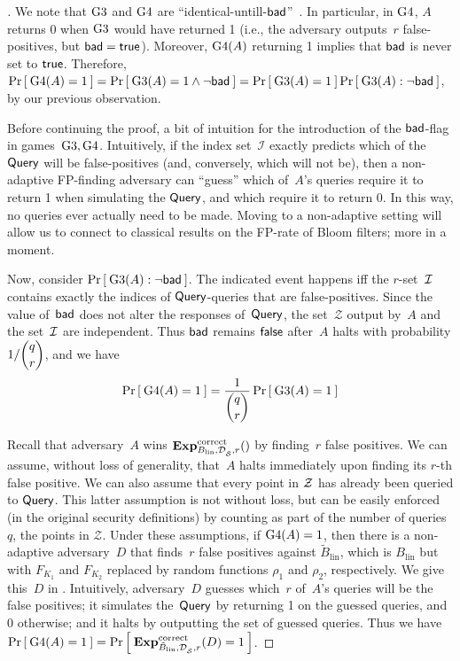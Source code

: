 \begin{proof}[]
We note that $\text{G3}$ and $\text{G4}$ are
``identical-untill-$\mathsf{bad}$''~\cite{BeRo-gameplaying}.  In particular,
in $\text{G4}$, $A$ returns 0 when $\text{G3}$ would have returned 1 (i.e.,
the adversary outputs~$r$ false-positives, but $\mathsf{bad}=\mathsf{true}$).  
Moreover,  $\text{G4}(A)$ returning 1 implies that $\mathsf{bad}$ is never set to $\mathsf{true}$. Therefore,
$\Pr\left[\: \text{G4}(A)=1 \:\right] = \Pr\left[\: \text{G3}(A)=1 \wedge \neg\mathsf{bad} \:\right] =
\Pr\left[\: \text{G3}(A)=1 \:\right] \Pr\left[\: \text{G3}(A) : \neg\mathsf{bad} \:\right]$, by our previous observation.

Before continuing the proof, a bit of intuition for the introduction
of the $\mathsf{bad}$-flag in games~$\text{G3},\text{G4}$.   Intuitively, if the index
set~$\mathcal{I}$ exactly predicts which of the $\mathsf{Query}$ will be
false-positives (and, conversely, which will not be), then a
non-adaptive FP-finding adversary can ``guess'' which of~$A$'s queries require it
to return 1 when simulating the $\mathsf{Query}$, and which require it to
return 0.  In this way, no queries ever actually need to be made.
Moving to a non-adaptive setting will allow us to connect to classical
results on the FP-rate of Bloom filters; more in a moment. 

Now, consider $\Pr\left[\: \text{G3}(A) : \neg\mathsf{bad} \:\right]$.  The indicated event
happens iff the $r$-set~${\cal I}$ contains exactly the indices of
$\mathsf{Query}$-queries that are false-positives.  Since the value
of~$\mathsf{bad}$ does not alter the responses of~$\mathsf{Query}$, the
set~$\mathcal{Z}$ output by~$A$ and the set~${\cal I}$ are independent.
Thus $\mathsf{bad}$ remains $\mathsf{false}$ after~$A$ halts with probability
$1/\dbinom{q}{r}$, and we have 
\begin{equation*}
\Pr\left[\: \text{G4}(A)=1 \:\right] = \frac{1}{\dbinom{q}{r}}\Pr\left[\: \text{G3}(A)=1 \:\right]
\end{equation*}

Recall that adversary~$A$ wins $\mathrm{\mathbf{Exp}}^{\mathrm{correct}}_{B_{\mathrm{lin}},\mathcal{D}_{{\cal S}}^{},r}()$ by finding~$r$ false positives. We can assume, without loss of generality,  that~$A$ halts immediately upon finding its $r$-th false positive.  We can also assume that every point in ${\cal Z}$ has already been queried to $\mathsf{Query}$.  This latter assumption is not without loss, but can be  easily enforced (in the original security definitions) by counting as part of the number of queries~$q$, the points in $\mathcal{Z}$. 
%
Under these assumptions, if $\text{G4}(A)=1$, then there is a non-adaptive adversary~$D$ that finds~$r$ false positives against $\tilde{B}_{\mathrm{lin}}$, which is $B_{\mathrm{lin}}$ but with $F_{K_1}$ and $F_{K_2}$ replaced by random functions $\rho_1$ and $\rho_2$, respectively.  We give this~$D$ in . Intuitively, adversary~$D$ guesses which~$r$ of~$A$'s queries will be the false positives; it simulates the~$\mathsf{Query}$ by returning 1 on the guessed queries, and 0 otherwise; and it halts by outputting the set of guessed queries.  Thus we have
$\Pr\left[\: \text{G4}(A)=1 \:\right] =\Pr\left[\: \mathrm{\mathbf{Exp}}^{\mathrm{correct}}_{\tilde{B}_{\mathrm{lin}},\mathcal{D}_{{\cal S}}^{},r}(D) = 1 \:\right]$.


\end{proof}
